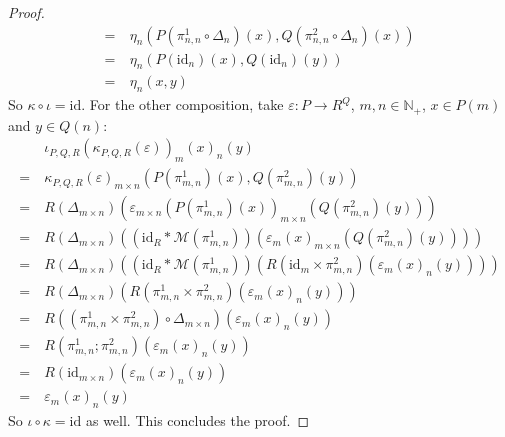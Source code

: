 \documentclass{article}
\theoremstyle{remark}
\theoremstyle{definition}
\newcommand{\N}{\mathbb N}
\newcommand{\id}{\mathrm{id}}
\newcommand{\M}{\mathcal M}
\begin{document}
\begin{proof}
\begin{align*}
			=\ &\eta_n(P(\pi^1_{n,n}\circ\Delta_n)(x),Q(\pi^2_{n,n}\circ\Delta_n)(x))\\
			=\ &\eta_n(P(\id_n)(x), Q(\id_n)(y))\\
			=\ &\eta_n(x,y)
		\end{align*}
		So $\kappa\circ\iota=\id$. For the other composition, take $\varepsilon:P\to R^Q$, $m,n\in\N_+$, $x\in P(m)$ and $y\in Q(n)$:
		\begin{align*}
			&\iota_{P,Q,R}(\kappa_{P,Q,R}(\varepsilon))_m(x)_n(y)\\
			=\ &\kappa_{P,Q,R}(\varepsilon)_{m\times n}(P(\pi^1_{m,n})(x), Q(\pi^2_{m,n})(y))\\
			=\ &R(\Delta_{m\times n})(\varepsilon_{m\times n}(P(\pi^1_{m,n})(x))_{m\times n}(Q(\pi^2_{m,n})(y)))\\
			=\ &R(\Delta_{m\times n})((\id_R*\M(\pi^1_{m,n}))(\varepsilon_m(x)_{m\times n}(Q(\pi^2_{m,n})(y))))\\
			=\ &R(\Delta_{m\times n})((\id_R*\M(\pi^1_{m,n}))(R(\id_m\times \pi^2_{m, n})(\varepsilon_m(x)_n(y))))\\
			=\ &R(\Delta_{m\times n})(R(\pi^1_{m,n}\times\pi^2_{m,n})(\varepsilon_m(x)_n(y)))\\
			=\ &R((\pi^1_{m,n}\times\pi^2_{m,n})\circ\Delta_{m\times n})(\varepsilon_m(x)_n(y))\\
			=\ &R(\pi^1_{m,n};\pi^2_{m,n})(\varepsilon_m(x)_n(y))\\
			=\ &R(\id_{m\times n})(\varepsilon_m(x)_n(y))\\
			=\ &\varepsilon_m(x)_n(y)
		\end{align*}
		So $\iota\circ\kappa=\id$ as well. This concludes the proof.
	\end{proof}
\end{document}
